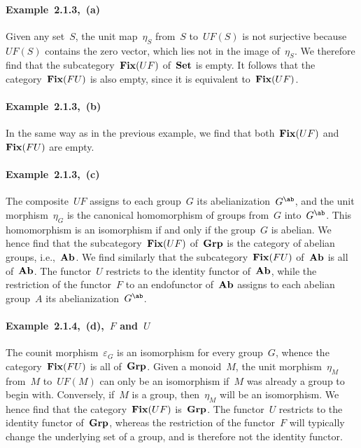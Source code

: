 \paragraph{Example~2.1.3,~(a)}
Given any set~$S$, the unit map~$η_S$ from~$S$ to~$UF(S)$ is not surjective because~$UF(S)$ contains the zero vector, which lies not in the image of~$η_S$.
We therefore find that the subcategory~$\mathop{\mathbf{Fix}}(UF)$ of~$\mathbf{Set}$ is empty.
It follows that the category~$\mathop{\mathbf{Fix}}(FU)$ is also empty, since it is equivalent to~$\mathop{\mathbf{Fix}}(UF)$.

\paragraph{Example~2.1.3,~(b)}
In the same way as in the previous example, we find that both~$\mathop{\mathbf{Fix}}(UF)$ and~$\mathop{\mathbf{Fix}}(FU)$ are empty.

\paragraph{Example~2.1.3,~(c)}
The composite~$UF$ assigns to each group~$G$ its abelianization~$G^{\ab}$, and the unit morphism~$η_G$ is the canonical homomorphism of groups from~$G$ into~$G^{\ab}$.
This homomorphism is an isomorphism if and only if the group~$G$ is abelian.
We hence find that the subcategory~$\mathop{\mathbf{Fix}}(UF)$ of~$\mathbf{Grp}$ is the category of abelian groups, i.e.,~$\mathbf{Ab}$.
We find similarly that the subcategory~$\mathop{\mathbf{Fix}}(FU)$ of~$\mathbf{Ab}$ is all of~$\mathbf{Ab}$.
The functor~$U$ restricts to the identity functor of~$\mathbf{Ab}$, while the restriction of the functor~$F$ to an endofunctor of~$\mathbf{Ab}$ assigns to each abelian group~$A$ its abelianization~$G^{\ab}$.

\paragraph{Example~2.1.4,~(d),~$F$ and~$U$}
The counit morphism~$ε_G$ is an isomorphism for every group~$G$, whence the category~$\mathop{\mathbf{Fix}}(FU)$ is all of~$\mathbf{Grp}$.
Given a monoid~$M$, the unit morphism~$η_M$ from~$M$ to~$UF(M)$ can only be an isomorphism if~$M$ was already a group to begin with.
Conversely, if~$M$ is a group, then~$η_M$ will be an isomorphism.
We hence find that the category~$\mathop{\mathbf{Fix}}(UF)$ is~$\mathbf{Grp}$.
The functor~$U$ restricts to the identity functor of~$\mathbf{Grp}$, whereas the restriction of the functor~$F$ will typically change the underlying set of a group, and is therefore not the identity functor.


